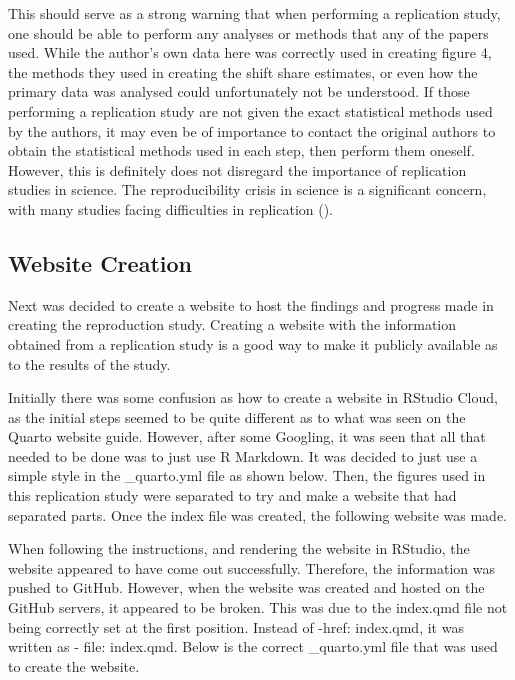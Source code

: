 \documentclass[
  man,
  floatsintext,
  longtable,
  nolmodern,
  notxfonts,
  notimes,
  colorlinks=true,linkcolor=blue,citecolor=blue,urlcolor=blue]{apa7}
\begin{document}
This should serve as a strong warning that when performing a replication
study, one should be able to perform any analyses or methods that any of
the papers used. While the author's own data here was correctly used in
creating figure 4, the methods they used in creating the shift share
estimates, or even how the primary data was analysed could unfortunately
not be understood. If those performing a replication study are not given
the exact statistical methods used by the authors, it may even be of
importance to contact the original authors to obtain the statistical
methods used in each step, then perform them oneself. However, this is
definitely does not disregard the importance of replication studies in
science. The reproducibility crisis in science is a significant concern,
with many studies facing difficulties in replication
().

\subsection{Website Creation}\label{website-creation}

Next was decided to create a website to host the findings and progress
made in creating the reproduction study. Creating a website with the
information obtained from a replication study is a good way to make it
publicly available as to the results of the study.

Initially there was some confusion as how to create a website in RStudio
Cloud, as the initial steps seemed to be quite different as to what was
seen on the Quarto website guide. However, after some Googling, it was
seen that all that needed to be done was to just use R Markdown. It was
decided to just use a simple style in the \_quarto.yml file as shown
below. Then, the figures used in this replication study were separated
to try and make a website that had separated parts. Once the index file
was created, the following website was made.

When following the instructions, and rendering the website in RStudio,
the website appeared to have come out successfully. Therefore, the
information was pushed to GitHub. However, when the website was created
and hosted on the GitHub servers, it appeared to be broken. This was due
to the index.qmd file not being correctly set at the first position.
Instead of -href: index.qmd, it was written as - file: index.qmd. Below
is the correct \_quarto.yml file that was used to create the website.
\end{document}
